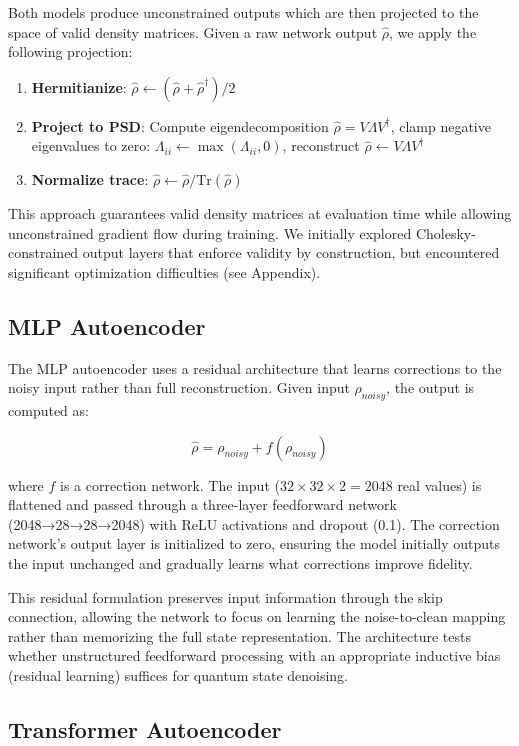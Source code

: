 \documentclass[11pt]{article}
\begin{document}
Both models produce unconstrained outputs which are then projected to the space of valid density matrices. Given a raw network output \(\hat{\rho}\), we apply the following projection:

\begin{enumerate}
\item \textbf{Hermitianize}: \(\hat{\rho} \leftarrow (\hat{\rho} + \hat{\rho}^\dagger)/2\)
\item \textbf{Project to PSD}: Compute eigendecomposition \(\hat{\rho} = V \Lambda V^\dagger\), clamp negative eigenvalues to zero: \(\Lambda_{ii} \leftarrow \max(\Lambda_{ii}, 0)\), reconstruct \(\hat{\rho} \leftarrow V \Lambda V^\dagger\)
\item \textbf{Normalize trace}: \(\hat{\rho} \leftarrow \hat{\rho} / \mathrm{Tr}(\hat{\rho})\)
\end{enumerate}

This approach guarantees valid density matrices at evaluation time while allowing unconstrained gradient flow during training. We initially explored Cholesky-constrained output layers that enforce validity by construction, but encountered significant optimization difficulties (see Appendix).
\subsection{MLP Autoencoder}
\label{sec:org9786f71}

The MLP autoencoder uses a residual architecture that learns corrections to the noisy input rather than full reconstruction. Given input \(\rho_{noisy}\), the output is computed as:

$$\hat{\rho} = \rho_{noisy} + f(\rho_{noisy})$$

where \(f\) is a correction network. The input (\(32 \times 32 \times 2 = 2048\) real values) is flattened and passed through a three-layer feedforward network (2048→28→28→2048) with ReLU activations and dropout (0.1). The correction network's output layer is initialized to zero, ensuring the model initially outputs the input unchanged and gradually learns what corrections improve fidelity.

This residual formulation preserves input information through the skip connection, allowing the network to focus on learning the noise-to-clean mapping rather than memorizing the full state representation. The architecture tests whether unstructured feedforward processing with an appropriate inductive bias (residual learning) suffices for quantum state denoising.
\subsection{Transformer Autoencoder}
\label{sec:org07f19a9}
\end{document}

